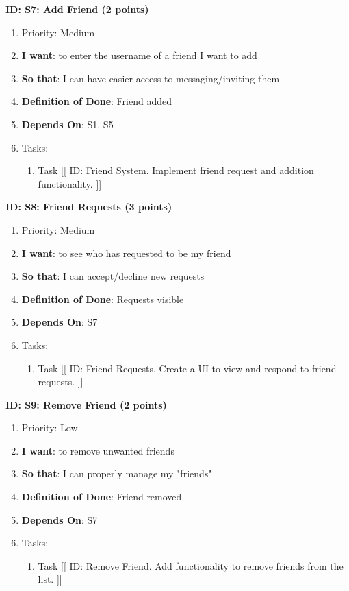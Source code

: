 \textbf{ID: S7: Add Friend (2 points)}
\begin{enumerate}
    \item Priority: Medium
    \item \textbf{I want}: to enter the username of a friend I want to add
    \item \textbf{So that}: I can have easier access to messaging/inviting them
    \item \textbf{Definition of Done}: Friend added
    \item \textbf{Depends On}: S1, S5
    \item Tasks:
    \begin{enumerate}
        \item Task [[ ID: Friend System. Implement friend request and addition functionality. ]]
    \end{enumerate}
\end{enumerate}

\textbf{ID: S8: Friend Requests (3 points)}
\begin{enumerate}
    \item Priority: Medium
    \item \textbf{I want}: to see who has requested to be my friend
    \item \textbf{So that}: I can accept/decline new requests
    \item \textbf{Definition of Done}: Requests visible
    \item \textbf{Depends On}: S7
    \item Tasks:
    \begin{enumerate}
        \item Task [[ ID: Friend Requests. Create a UI to view and respond to friend requests. ]]
    \end{enumerate}
\end{enumerate}

\textbf{ID: S9: Remove Friend (2 points)}
\begin{enumerate}
    \item Priority: Low
    \item \textbf{I want}: to remove unwanted friends
    \item \textbf{So that}: I can properly manage my "friends"
    \item \textbf{Definition of Done}: Friend removed
    \item \textbf{Depends On}: S7
    \item Tasks:
    \begin{enumerate}
        \item Task [[ ID: Remove Friend. Add functionality to remove friends from the list. ]]
    \end{enumerate}
\end{enumerate}

